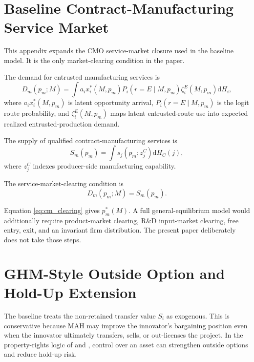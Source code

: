 \documentclass[12pt]{article}
\newcommand{\1}{\mathbf{1}}
\newcommand{\dd}{\mathrm{d}}
\begin{document}
\section{Baseline Contract-Manufacturing Service Market}
\label{sec:appendix_cm_market}

This appendix expands the CMO service-market closure used in the baseline model. It is the only market-clearing condition in the paper.

The demand for entrusted manufacturing services is
\begin{equation}
    D_m(p_m;M)
    =
    \int
    a_i x_i^*(M,p_m)
    P_i(r=E\mid M,p_m)
    \zeta_i^E(M,p_m)
    \dd H_i,
    \label{eq:cm_demand}
\end{equation}
where $a_i x_i^*(M,p_m)$ is latent opportunity arrival, $P_i(r=E\mid M,p_m)$ is the logit route probability, and $\zeta_i^E(M,p_m)$ maps latent entrusted-route use into expected realized entrusted-production demand.

The supply of qualified contract-manufacturing services is
\begin{equation}
    S_m(p_m)=\int s_j(p_m;z_j^C)\dd H_C(j),
    \label{eq:cm_supply}
\end{equation}
where $z_j^C$ indexes producer-side manufacturing capability.

The service-market-clearing condition is
\begin{equation}
    D_m(p_m;M)=S_m(p_m).
    \label{eq:cm_clearing}
\end{equation}

Equation \eqref{eq:cm_clearing} gives $p_m^*(M)$. A full general-equilibrium model would additionally require product-market clearing, R\&D input-market clearing, free entry, exit, and an invariant firm distribution. The present paper deliberately does not take those steps.

\section{GHM-Style Outside Option and Hold-Up Extension}
\label{sec:ghm_extension}

The baseline treats the non-retained transfer value $S_i$ as exogenous. This is conservative because MAH may improve the innovator's bargaining position even when the innovator ultimately transfers, sells, or out-licenses the project. In the property-rights logic of \citet{GrossmanHart1986} and \citet{HartMoore1990}, control over an asset can strengthen outside options and reduce hold-up risk.
\end{document}
